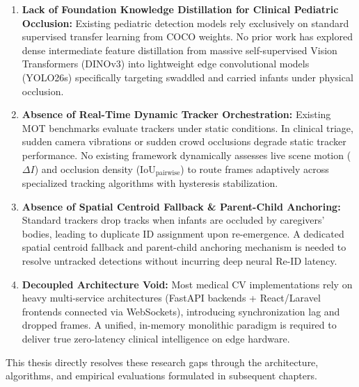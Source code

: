 \begin{enumerate}
\def\labelenumi{\arabic{enumi}.}
\tightlist
\item
  \textbf{Lack of Foundation Knowledge Distillation for Clinical
  Pediatric Occlusion:} Existing pediatric detection models rely
  exclusively on standard supervised transfer learning from COCO
  weights. No prior work has explored dense intermediate feature
  distillation from massive self-supervised Vision Transformers (DINOv3)
  into lightweight edge convolutional models (YOLO26s) specifically
  targeting swaddled and carried infants under physical occlusion.
\item
  \textbf{Absence of Real-Time Dynamic Tracker Orchestration:} Existing
  MOT benchmarks evaluate trackers under static conditions. In clinical
  triage, sudden camera vibrations or sudden crowd occlusions degrade
  static tracker performance. No existing framework dynamically assesses
  live scene motion (\(\Delta I\)) and occlusion density
  (\(\text{IoU}_{\text{pairwise}}\)) to route frames adaptively across
  specialized tracking algorithms with hysteresis stabilization.
\item
  \textbf{Absence of Spatial Centroid Fallback \& Parent-Child
  Anchoring:} Standard trackers drop tracks when infants are occluded by
  caregivers' bodies, leading to duplicate ID assignment upon
  re-emergence. A dedicated spatial centroid fallback and parent-child
  anchoring mechanism is needed to resolve untracked detections without
  incurring deep neural Re-ID latency.
\item
  \textbf{Decoupled Architecture Void:} Most medical CV implementations
  rely on heavy multi-service architectures (FastAPI backends +
  React/Laravel frontends connected via WebSockets), introducing
  synchronization lag and dropped frames. A unified, in-memory
  monolithic paradigm is required to deliver true zero-latency clinical
  intelligence on edge hardware.
\end{enumerate}

This thesis directly resolves these research gaps through the
architecture, algorithms, and empirical evaluations formulated in
subsequent chapters.
